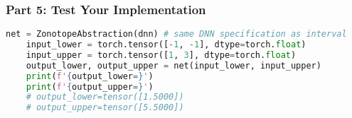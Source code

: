\subsubsection{Part 5: Test Your Implementation}


\begin{lstlisting}[language=Python]
    net = ZonotopeAbstraction(dnn) # same DNN specification as interval
    input_lower = torch.tensor([-1, -1], dtype=torch.float)
    input_upper = torch.tensor([1, 3], dtype=torch.float)
    output_lower, output_upper = net(input_lower, input_upper)
    print(f'{output_lower=}')
    print(f'{output_upper=}')
    # output_lower=tensor([1.5000])
    # output_upper=tensor([5.5000])
\end{lstlisting}
